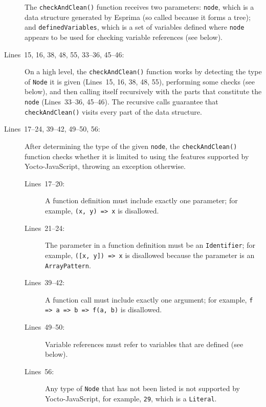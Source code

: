 \documentclass[12pt, oneside]{book}
\begin{document}
\begin{description}
The \texttt{checkAndClean()} function receives two parameters: \texttt{node}, which is a data structure generated by Esprima (so called because it forms a tree); and \texttt{definedVariables}, which is a set of variables defined where \texttt{node} appears to be used for checking variable references (see below).

\item [Lines~15, 16, 38, 48, 55, 33–36, 45–46:]

On a high level, the \texttt{checkAndClean()} function works by detecting the type of \texttt{Node} it is given (Lines~15, 16, 38, 48, 55), performing some checks (see below), and then calling itself recursively with the parts that constitute the \texttt{node} (Lines~33–36, 45–46). The recursive calls guarantee that \texttt{checkAndClean()} visits every part of the data structure.

\item [Lines~17–24, 39–42, 49–50, 56:]

After determining the type of the given \texttt{node}, the \texttt{checkAndClean()} function checks whether it is limited to using the features supported by Yocto-JavaScript, throwing an exception otherwise.

\begin{description}
\item [Lines~17–20:]

A function definition must include exactly one parameter; for example, \texttt{(x, y) => x} is disallowed.

\item [Lines~21–24:]

The parameter in a function definition must be an \texttt{Identifier}; for example, \texttt{([x, y]) => x} is disallowed because the parameter is an \texttt{ArrayPattern}.

\item [Lines~39–42:]

A function call must include exactly one argument; for example, \texttt{f => a => b => f(a, b)} is disallowed.

\item [Lines~49–50:]

Variable references must refer to variables that are defined (see below).

\item [Lines~56:]

Any type of \texttt{Node} that has not been listed is not supported by Yocto-JavaScript, for example, \texttt{29}, which is a \texttt{Literal}.
\end{description}


\end{description}
\end{document}
